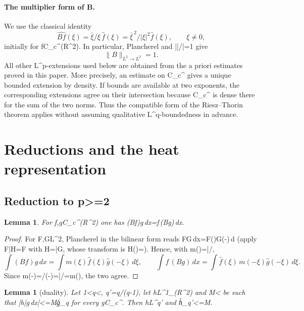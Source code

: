 \documentclass[10pt,reqno]{amsart}
\def\({}\def\){}%
\def\frac#1#2{#1/#2}%
\def\ge{>=}\def\le{<=}%
\newtheorem{lemma}[theorem]{Lemma}
\theoremstyle{definition}
\theoremstyle{remark}
\begin{document}
\paragraph{The multiplier form of \(B\).}
We use the classical identity
\[\widehat{Bf}(\xi)=\frac{\bar\xi}{\xi}\,\widehat f(\xi)
 =\frac{\bar\xi^{\,2}}{|\xi|^2}\widehat f(\xi),
 \qquad \xi\ne0, \tag{0.1}\]
initially for \(f\in C_c^\infty(\mathbb R^2)\).  In particular, Plancherel and
\(|\bar\xi/\xi|=1\) give
\[\|B\|_{L^2\to L^2}=1. \tag{0.2}\]
All other \(L^p\)-extensions used below are obtained from the a priori estimates
proved in this paper.  More precisely, an estimate on \(C_c^\infty\) gives a
unique bounded extension by density.  If bounds are available at two exponents,
the corresponding extensions agree on their intersection because
\(C_c^\infty\) is dense there for the sum of the two norms.  Thus the compatible
form of the Riesz--Thorin theorem applies without assuming qualitative
\(L^q\)-boundedness in advance.

\section{Reductions and the heat representation}\label{sec:heat}

\subsection{Reduction to \(p\ge2\)}\label{subsec:duality}

\begin{lemma}\label{lem:1-1}
For \(f,g\in C_c^\infty(\mathbb R^2)\) one has \(\int (Bf)g\,dx=\int f\,(Bg)\,dx\).
\end{lemma}

\begin{proof}
For \(F,G\in L^2\), Plancherel in the bilinear form reads \(\int FG\,dx=\int\hat F(\xi)\hat G(-\xi)\,d\xi\) (apply \(\int F\bar H=\int\hat F\) with \(H=\bar G\), whose transform is \(\hat H(\xi)=\)). Hence, with \(m(\xi)=\bar\xi/\xi\), \[\int (Bf)g\,dx=\int m(\xi)\hat f(\xi)\hat g(-\xi)\,d\xi,\qquad
\int f\,(Bg)\,dx=\int \hat f(\xi)\,m(-\xi)\hat g(-\xi)\,d\xi .\] Since \(m(-\xi)=\overline{(-\xi)}/(-\xi)=\bar\xi/\xi=m(\xi)\), the two agree.
\end{proof}

\begin{lemma}[duality]\label{lem:1-2}
Let \(1<q<\infty\), \(q'=q/(q-1)\), let \(h\in L^1_{}(\mathbb R^2)\) and \(M<\infty\) be such that \(\big|\int h\bar g\,dx\big|\le M\|g\|_{q}\) for every \(g\in C_c^\infty\). Then \(h\in L^{q'}\) and \(\|h\|_{q'}\le M\).
\end{lemma}
\end{document}

